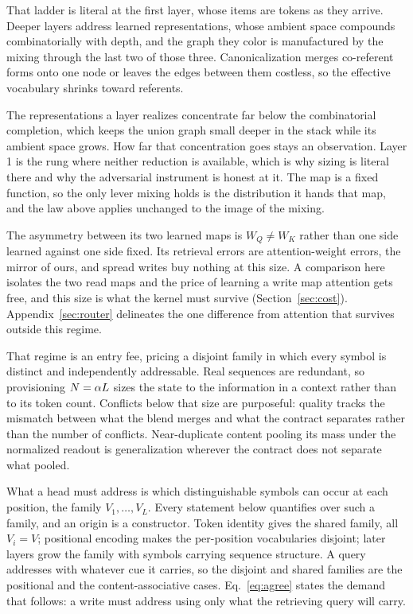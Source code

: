 That ladder is literal at the first layer, whose items are tokens as they arrive. Deeper layers address learned representations, whose ambient space compounds combinatorially with depth, and the graph they color is manufactured by the mixing through the last two of those three. Canonicalization merges co-referent forms onto one node or leaves the edges between them costless, so the effective vocabulary shrinks toward referents.

The representations a layer realizes concentrate far below the combinatorial completion, which keeps the union graph small deeper in the stack while its ambient space grows. How far that concentration goes stays an observation. Layer 1 is the rung where neither reduction is available, which is why sizing is literal there and why the adversarial instrument is honest at it. The map is a fixed function, so the only lever mixing holds is the distribution it hands that map, and the law above applies unchanged to the image of the mixing.

The asymmetry between its two learned maps is $W_Q \neq W_K$ rather than one side learned against one side fixed. Its retrieval errors are attention-weight errors, the mirror of ours, and spread writes buy nothing at this size. A comparison here isolates the two read maps and the price of learning a write map attention gets free, and this size is what the kernel must survive (Section~\ref{sec:cost}). Appendix~\ref{sec:router} delineates the one difference from attention that survives outside this regime.

That regime is an entry fee, pricing a disjoint family in which every symbol is distinct and independently addressable. Real sequences are redundant, so provisioning $N = \alpha L$ sizes the state to the information in a context rather than to its token count. Conflicts below that size are purposeful: quality tracks the mismatch between what the blend merges and what the contract separates rather than the number of conflicts. Near-duplicate content pooling its mass under the normalized readout is generalization wherever the contract does not separate what pooled.

What a head must address is which distinguishable symbols can occur at each position, the family $V_1,\dots,V_L$. Every statement below quantifies over such a family, and an origin is a constructor. Token identity gives the shared family, all $V_i = V$; positional encoding makes the per-position vocabularies disjoint; later layers grow the family with symbols carrying sequence structure. A query addresses with whatever cue it carries, so the disjoint and shared families are the positional and the content-associative cases. Eq.~\eqref{eq:agree} states the demand that follows: a write must address using only what the retrieving query will carry.

